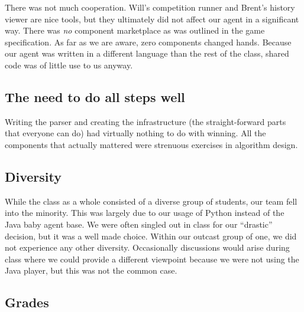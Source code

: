 \documentclass[letterpaper,12pt,oneside]{article}
\begin{document}
There was not much cooperation. Will's competition runner and Brent's
history viewer are nice tools, but they ultimately did not affect our
agent in a significant way. There was {\em no} component marketplace as was
outlined in the game specification. As far as we are aware, zero components
changed hands. Because our agent was written in a different language than the
rest of the class, shared code was of little use to us anyway.

\subsection{The need to do all steps well}

Writing the parser and creating the infrastructure (the straight-forward
parts that everyone can do) had virtually nothing to do with winning. All
the components that actually mattered were strenuous exercises in algorithm
design. 

\subsection{Diversity}
% 

While the class as a whole consisted of a diverse group of students, our team
fell into the minority. This was largely due to our usage of Python instead of
the Java baby agent base. We were often singled out in class for our
``drastic'' decision, but it was a well made choice. Within our outcast group
of one, we did not experience any other diversity. Occasionally discussions
would arise during class where we could provide a different viewpoint because
we were not using the Java player, but this was not the common case.

\subsection{Grades}
\end{document}
